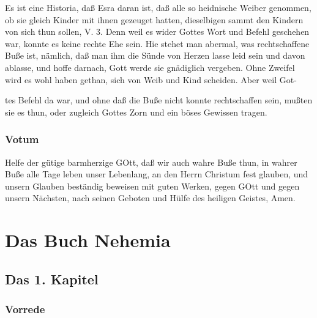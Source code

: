 Es ist eine Historia, daß Esra daran ist, daß alle so heidnische Weiber genommen, ob sie gleich Kinder mit ihnen gezeuget hatten, dieselbigen sammt den Kindern von sich thun sollen, V. 3. Denn weil es wider Gottes Wort und Befehl geschehen war, konnte es keine rechte Ehe sein. Hie stehet man abermal, was rechtschaffene Buße ist, nämlich, daß man ihm die Sünde von Herzen lasse leid sein und davon ablasse, und hoffe darnach, Gott werde sie gnädiglich vergeben. Ohne Zweifel wird es wohl haben gethan, sich von Weib und Kind scheiden. Aber weil Got-

tes Befehl da war, und ohne daß die Buße nicht konnte rechtschaffen sein, mußten sie es thun, oder zugleich Gottes Zorn und ein böses Gewissen tragen.

\section{Votum}

Helfe der gütige barmherzige GOtt, daß wir auch wahre Buße thun, in wahrer Buße alle Tage leben unser Lebenlang, an den Herrn Christum fest glauben, und unsern Glauben beständig beweisen mit guten Werken, gegen GOtt und gegen unsern Nächsten, nach seinen Geboten und Hülfe des heiligen Geistes, Amen.

\part{Das Buch Nehemia}

\chapter{Das 1. Kapitel}

\section{Vorrede}

